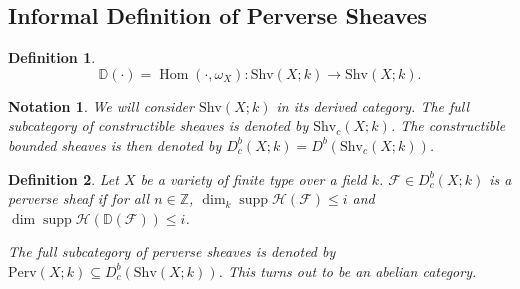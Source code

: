 \documentclass[8pt]{article}
\numberwithin{equation}{section}
\newtheorem{definition}{Definition}[section]
\newtheorem{notation}{Notation}[section]
\DeclareMathOperator{\Hom}{Hom}
\DeclareMathOperator{\supp}{supp}
\newcommand{\Z}[0]{\mathbb{Z}}
\newcommand{\bD}[0]{\mathbb{D}}
\newcommand{\cH}[0]{\mathcal{H}}
\newcommand{\cF}[0]{\mathcal{F}}
\newcommand{\Shv}[0]{\mathrm{Shv}}
\newcommand{\Perv}[0]{\mathrm{Perv}}
\begin{document}
\subsection{Informal Definition of Perverse Sheaves}

\begin{definition}
    \begin{equation*}
        \bD(\cdot) = \Hom(\cdot,\omega_X):\Shv(X;k)\to\Shv(X;k).
    \end{equation*}
\end{definition}


\begin{notation}
    We will consider $\Shv(X;k)$ in its derived category. The full subcategory of constructible sheaves is denoted by $\Shv_c(X;k)$. The constructible bounded sheaves is then denoted by $D_c^b(X;k)=D^b(\Shv_c(X;k))$.
    \begin{center}
\end{center}
\end{notation}


\begin{definition}
    Let $X$ be a variety of finite type over a field $k$. 
    $\cF\in D_c^b(X;k)$ is a perverse sheaf if for all $n\in\Z$, $\dim_k\supp\mathcal{H}(\cF)\leq i$ and $\dim\supp\cH(\bD(\cF))\leq i$.
    \par The full subcategory of perverse sheaves is denoted by $\Perv(X;k)\subseteq D_c^b(\Shv(X;k))$. This turns out to be an abelian category.
\end{definition}
\end{document}
